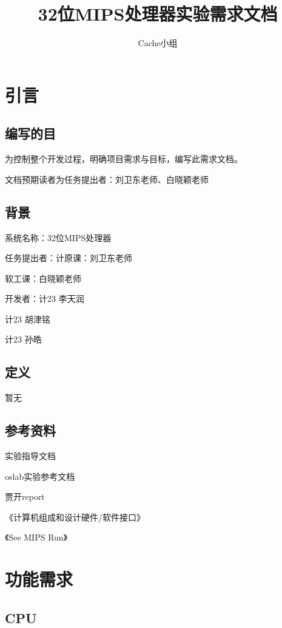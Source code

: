 \documentclass[12pt,a4paper]{article}
\begin{document}
\begin{CJK}{UTF8}{gkai}
\author{Cache小组}
\title{32位MIPS处理器实验需求文档}
\maketitle
\end{CJK}

\begin{CJK}{UTF8}{gbsn}
\tableofcontents

\section{引言}
	\subsection{编写的目}
		为控制整个开发过程，明确项目需求与目标，编写此需求文档。\par
		文档预期读者为任务提出者：刘卫东老师、白晓颖老师
	\subsection{背景}
		\quad 系统名称：32位MIPS处理器\par
		\quad 任务提出者：计原课：刘卫东老师\par
		\quad 软工课：白晓颖老师\par
		\quad 开发者：计23 李天润\par
		\quad\quad		计23 胡津铭\par
		\quad\quad		计23 孙皓\par
	\subsection{定义}
		暂无
	\subsection{参考资料}
		实验指导文档\par
		oslab实验参考文档\par
		贾开report\par
		《计算机组成和设计硬件/软件接口》\par
		《See MIPS Run》\par

\section{功能需求}
	\subsection{CPU}

\end{CJK}
\end{document}
